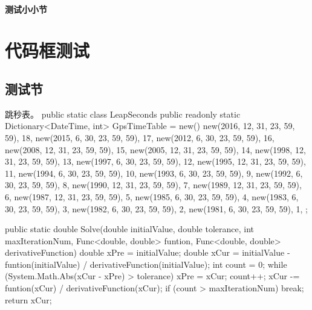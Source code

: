\documentclass[codepkg = minted, titlestyle = lralign]{course-report}
\begin{document}
\zhlipsum[1]


\subsubsection{测试小小节}

\zhlipsum[1]

\begin{english}
  \bfseries
  \lipsum[6-7]
\end{english}

\zhlipsum[1]


\chapter{代码框测试}

\section{测试节}

\begin{codebox}[
  minted language = csharp
]{跳秒表。}
public static class LeapSeconds
{
    public readonly static Dictionary<DateTime, int> GpsTimeTable = new() 
    {
        {new(2016, 12, 31, 23, 59, 59), 18},
        {new(2015, 6, 30, 23, 59, 59), 17},   
        {new(2012, 6, 30, 23, 59, 59), 16},    
        {new(2008, 12, 31, 23, 59, 59), 15},    
        {new(2005, 12, 31, 23, 59, 59), 14},    
        {new(1998, 12, 31, 23, 59, 59), 13},    
        {new(1997, 6, 30, 23, 59, 59), 12},    
        {new(1995, 12, 31, 23, 59, 59), 11},    
        {new(1994, 6, 30, 23, 59, 59), 10},    
        {new(1993, 6, 30, 23, 59, 59), 9},    
        {new(1992, 6, 30, 23, 59, 59), 8},    
        {new(1990, 12, 31, 23, 59, 59), 7},    
        {new(1989, 12, 31, 23, 59, 59), 6},    
        {new(1987, 12, 31, 23, 59, 59), 5},    
        {new(1985, 6, 30, 23, 59, 59), 4},    
        {new(1983, 6, 30, 23, 59, 59), 3},    
        {new(1982, 6, 30, 23, 59, 59), 2},    
        {new(1981, 6, 30, 23, 59, 59), 1},   
    };
}
\end{codebox}

\begin{codebox}
public static double Solve(double initialValue, double tolerance, int maxIterationNum, Func<double, double> funtion, Func<double, double> derivativeFunction)
{
    double xPre = initialValue;
    double xCur = initialValue - funtion(initialValue) / derivativeFunction(initialValue);
    int count = 0;
    while (System.Math.Abs(xCur - xPre) > tolerance)
    {
        xPre = xCur;
        count++;
        xCur -= funtion(xCur) / derivativeFunction(xCur);
        if (count > maxIterationNum)
            break;
    }
    return xCur;
}
\end{codebox}
\end{document}
